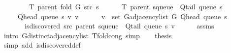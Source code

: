\begin{isabellebody}
%
\isadelimproof
%
\endisadelimproof
%
\isatagproof
{}\isamarkupfalse%
\ {\isacharminus}{\kern0pt}\isanewline
\ \ \isamarkupfalse%
\isanewline
\ \ \ \ {\isachardoublequoteopen}T\ {\isacharparenleft}{\kern0pt}parent\ {\isacharparenleft}{\kern0pt}fold\ G\ src\ s{\isacharparenright}{\kern0pt}{\isacharparenright}{\kern0pt}\ {\isacharequal}{\kern0pt}\isanewline
\ \ \ \ \ T\ {\isacharparenleft}{\kern0pt}parent\ {\isacharparenleft}{\kern0pt}s{\isasymlparr}queue\ {\isacharcolon}{\kern0pt}{\isacharequal}{\kern0pt}\ Q{\isacharunderscore}{\kern0pt}tail\ {\isacharparenleft}{\kern0pt}queue\ s{\isacharparenright}{\kern0pt}{\isasymrparr}{\isacharparenright}{\kern0pt}{\isacharparenright}{\kern0pt}\ {\isasymunion}\isanewline
\ \ \ \ \ {\isacharbraceleft}{\kern0pt}{\isacharparenleft}{\kern0pt}Q{\isacharunderscore}{\kern0pt}head\ {\isacharparenleft}{\kern0pt}queue\ s{\isacharparenright}{\kern0pt}{\isacharcomma}{\kern0pt}\ v{\isacharparenright}{\kern0pt}\ {\isacharbar}{\kern0pt}v{\isachardot}{\kern0pt}\isanewline
\ \ \ \ \ \ v\ {\isasymin}\ set\ {\isacharparenleft}{\kern0pt}G{\isachardot}{\kern0pt}adjacency{\isacharunderscore}{\kern0pt}list\ G\ {\isacharparenleft}{\kern0pt}Q{\isacharunderscore}{\kern0pt}head\ {\isacharparenleft}{\kern0pt}queue\ s{\isacharparenright}{\kern0pt}{\isacharparenright}{\kern0pt}{\isacharparenright}{\kern0pt}\ {\isasymand}\isanewline
\ \ \ \ \ \ {\isasymnot}\ is{\isacharunderscore}{\kern0pt}discovered\ src\ {\isacharparenleft}{\kern0pt}parent\ {\isacharparenleft}{\kern0pt}s{\isasymlparr}queue\ {\isacharcolon}{\kern0pt}{\isacharequal}{\kern0pt}\ Q{\isacharunderscore}{\kern0pt}tail\ {\isacharparenleft}{\kern0pt}queue\ s{\isacharparenright}{\kern0pt}{\isasymrparr}{\isacharparenright}{\kern0pt}{\isacharparenright}{\kern0pt}\ v{\isacharbraceright}{\kern0pt}{\isachardoublequoteclose}\isanewline
\ \ \ \ \isamarkupfalse%
\ assms\isanewline
\ \ \ \ \isamarkupfalse%
\ {\isacharparenleft}{\kern0pt}intro\ G{\isachardot}{\kern0pt}distinct{\isacharunderscore}{\kern0pt}adjacency{\isacharunderscore}{\kern0pt}list\ T{\isacharunderscore}{\kern0pt}fold{\isacharunderscore}{\kern0pt}cong{\isacharparenright}{\kern0pt}\ simp{\isacharplus}{\kern0pt}\isanewline
\ \ \isamarkupfalse%
\ {\isacharquery}{\kern0pt}thesis\isanewline
\ \ \ \ \isamarkupfalse%
\ {\isacharparenleft}{\kern0pt}simp\ add{\isacharcolon}{\kern0pt}\ is{\isacharunderscore}{\kern0pt}discovered{\isacharunderscore}{\kern0pt}def{\isacharparenright}{\kern0pt}\isanewline
{}\isamarkupfalse%
%
\endisatagproof

\end{isabellebody}
